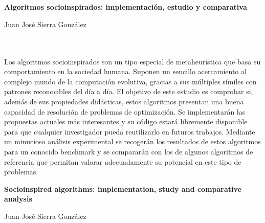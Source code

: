 \chapter*{}






\cleardoublepage
\thispagestyle{empty}

\begin{center}
{\large\bfseries Algoritmos socioinspirados: implementación, estudio y comparativa}\\
\end{center}
\begin{center}
Juan José Sierra González\\
\end{center}

\\

\vspace{0.7cm}
\\

Los algoritmos socioinspirados son un tipo especial de metaheurística que basa su comportamiento en la sociedad humana. Suponen un sencillo acercamiento al complejo mundo de la computación evolutiva, gracias a sus múltiples símiles con patrones reconocibles del día a día. El objetivo de este estudio es comprobar si, además de sus propiedades didácticas, estos algoritmos presentan una buena capacidad de resolución de problemas de optimización. Se implementarán las propuestas actuales más interesantes y su código estará libremente disponible para que cualquier investigador pueda reutilizarlo en futuros trabajos. Mediante un minucioso análisis experimental se recogerán los resultados de estos algoritmos para un conocido benchmark y se compararán con los de algunos algoritmos de referencia que permitan valorar adecuadamente su potencial en este tipo de problemas.
\cleardoublepage


\thispagestyle{empty}


\begin{center}
{\large\bfseries Socioinspired algorithms: implementation, study and comparative analysis}\\
\end{center}
\begin{center}
Juan José Sierra González\\
\end{center}

